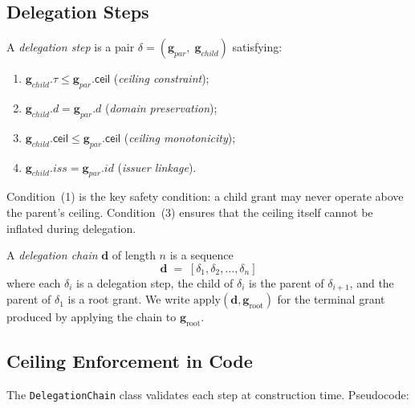 \documentclass[11pt]{article}
\newcommand{\AGrant}{\mathbf{g}}            %
\newcommand{\ACeil}{\mathsf{ceil}}          %
\newcommand{\ARoot}{\mathbf{g}_{\mathrm{root}}} %
\newcommand{\DChain}{\mathbf{d}}            %
\newcommand{\DApply}{\mathrm{apply}}        %
\begin{document}
\subsection{Delegation Steps}

\begin{definition}\label{def:step}
A \emph{delegation step} is a pair
$\delta = (\AGrant_{\mathit{par}},\; \AGrant_{\mathit{child}})$
satisfying:
\begin{enumerate}[leftmargin=1.5em,itemsep=2pt]
  \item $\AGrant_{\mathit{child}}.\tau \leq \AGrant_{\mathit{par}}.\ACeil$
        \quad(\emph{ceiling constraint});
  \item $\AGrant_{\mathit{child}}.d = \AGrant_{\mathit{par}}.d$
        \quad(\emph{domain preservation});
  \item $\AGrant_{\mathit{child}}.\ACeil \leq \AGrant_{\mathit{par}}.\ACeil$
        \quad(\emph{ceiling monotonicity});
  \item $\AGrant_{\mathit{child}}.\mathit{iss} = \AGrant_{\mathit{par}}.\mathit{id}$
        \quad(\emph{issuer linkage}).
\end{enumerate}
\end{definition}

Condition~(1) is the key safety condition: a child grant may never
operate above the parent's ceiling.  Condition~(3) ensures that the
ceiling itself cannot be inflated during delegation.

\begin{definition}\label{def:chain}
A \emph{delegation chain} $\DChain$ of length $n$ is a sequence
\[
  \DChain \;=\; [\delta_1, \delta_2, \ldots, \delta_n]
\]
where each $\delta_i$ is a delegation step, the child of $\delta_i$
is the parent of $\delta_{i+1}$, and the parent of $\delta_1$ is
a root grant.
We write $\DApply(\DChain, \ARoot)$ for the terminal grant produced
by applying the chain to $\ARoot$.
\end{definition}

\subsection{Ceiling Enforcement in Code}

The \texttt{DelegationChain} class validates each step at construction
time.  Pseudocode:
\end{document}
